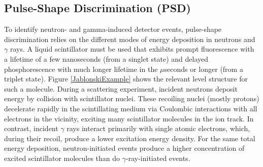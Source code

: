 \subsection{Pulse-Shape Discrimination (PSD)}
To identify neutron- and gamma-induced detector events, pulse-shape discrimination
relies on the different modes of energy deposition in neutrons and $\gamma$ rays.
A liquid scintillator must be used that exhibits prompt fluorescence with a
lifetime of a few nanoseconds (from a singlet
state) and delayed phosphorescence with much longer lifetime in the $\mu$seconds
or longer (from a triplet state). Figure \ref{JablonskiExample} shows the
relevant level structure for such a molecule. During a scattering experiment,
incident neutrons deposit energy by collision with scintillator nuclei.
These recoiling nuclei (mostly protons) decelerate rapidly in the scintillating
medium via Coulombic interactions with all electrons in the vicinity,
exciting many scintillator molecules in the
ion track. In contrast, incident $\gamma$ rays interact primarily with
single atomic electrons, which, during their recoil, produce a lower excitation energy density.
For the same total energy deposition,
neutron-initiated events produce a higher 
concentration of excited scintillator molecules than do $\gamma$-ray-initiated
events.

